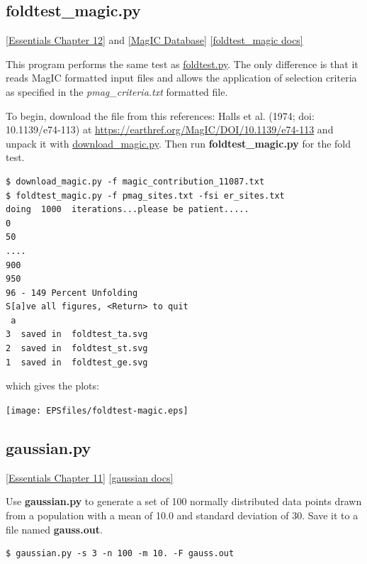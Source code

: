 \documentclass[11pt]{book}
\begin{document}
{{\subsection{foldtest\_magic.py} \href{http://earthref.org/MAGIC/books/Tauxe/Essentials/WebBook3ch12.html#ch12}{[Essentials Chapter 12]} and \href{#MagICDatabase}{[MagIC Database]}
\href{https://github.com/PmagPy/PmagPy/blob/master/programs/foldtest_magic.py}{[foldtest\_magic docs]}

This program performs the same test as \href{#foldtest.py}{foldtest.py}.  The only difference is that it reads MagIC formatted input files and allows the application of selection criteria as specified in the {\it pmag\_criteria.txt} formatted file.  

To begin, download the file from this references:  Halls et al. (1974; doi: 10.1139/e74-113) at \url{https://earthref.org/MagIC/DOI/10.1139/e74-113} and unpack it with  \href{#download_magic.py}{download\_magic.py}. Then run {\bf foldtest\_magic.py} for the fold test.

\begin{verbatim}
$ download_magic.py -f magic_contribution_11087.txt
$ foldtest_magic.py -f pmag_sites.txt -fsi er_sites.txt
doing  1000  iterations...please be patient.....
0
50
....
900
950
96 - 149 Percent Unfolding
S[a]ve all figures, <Return> to quit  
 a
3  saved in  foldtest_ta.svg
2  saved in  foldtest_st.svg
1  saved in  foldtest_ge.svg

\end{verbatim} 

\noindent  which gives the plots:

 {%
   \texttt{[image: EPSfiles/foldtest-magic.eps]}}


%
%

\subsection{gaussian.py}
 \href{http://earthref.org/MAGIC/books/Tauxe/Essentials/WebBook3ch11.html#ch11}{[Essentials Chapter 11]}
 \href{https://github.com/PmagPy/PmagPy/blob/master/programs/gaussian.py}{[gaussian docs]}


Use {\bf gaussian.py} to generate a set of 100 normally distributed data points drawn from a population with a mean of 10.0  and   standard deviation of 30.  Save it to a file named {\bf gauss.out}.

\begin{verbatim}
$ gaussian.py -s 3 -n 100 -m 10. -F gauss.out
\end{verbatim}

}}
\end{document}
